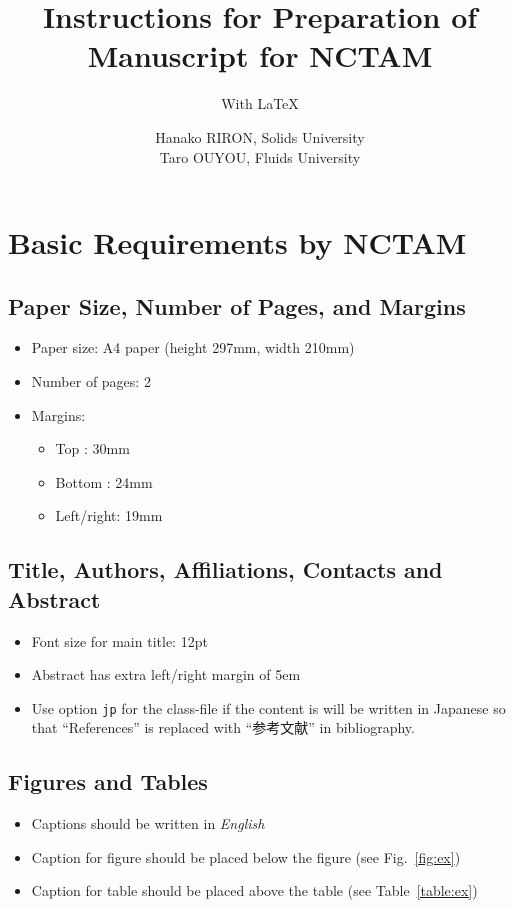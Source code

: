 \documentclass[jp]{nctam_proceeding}
\title{Instructions for Preparation of Manuscript for NCTAM}
\subtitle{With \LaTeX}   %
\author{Hanako RIRON, Solids University\\
        Taro OUYOU, Fluids University}
\begin{document}
\maketitle
\section{Basic Requirements by NCTAM}
\subsection{Paper Size, Number of Pages, and Margins}
\begin{itemize}
   \item Paper size: A4 paper (height 297mm, width 210mm)
   \item Number of pages: 2
   \item Margins:
   \begin{itemize}
      \item Top : 30mm
      \item Bottom : 24mm
      \item Left/right: 19mm
   \end{itemize}
\end{itemize}

\subsection{Title, Authors, Affiliations, Contacts and Abstract}
\begin{itemize}
   \item Font size for main title: 12pt
   \item Abstract has extra left/right margin of 5em
   \item Use option \texttt{jp} for the class-file if the content
      is will be written in Japanese so that ``References''
      is replaced with ``参考文献'' in bibliography.
\end{itemize}

\subsection{Figures and Tables}
\begin{itemize}
   \item Captions should be written in \emph{English}
   \item Caption for figure should be placed below the figure
      (see Fig.~\ref{fig:ex})
   \item Caption for table should be placed above the table
      (see Table~\ref{table:ex})
\end{itemize}
\end{document}

